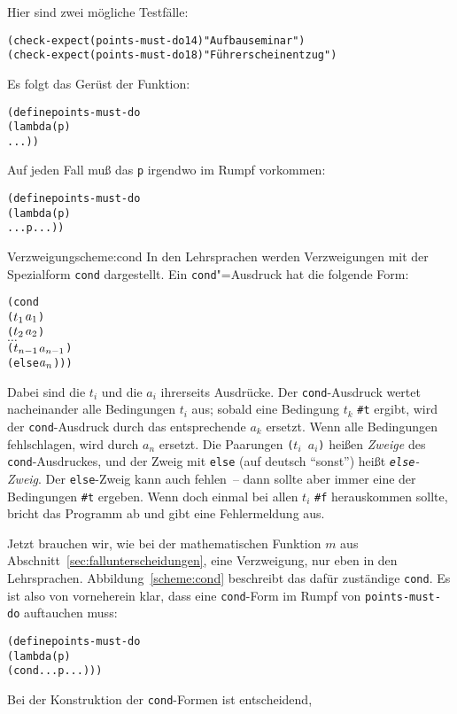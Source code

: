Hier sind zwei mögliche Testfälle:
%
\begin{alltt}
(check-expect (points-must-do 14) "Aufbauseminar")
(check-expect (points-must-do 18) "Führerscheinentzug")
\end{alltt}   
%
Es folgt das Gerüst der Funktion:
%
\begin{alltt}
(define points-must-do
  (lambda (p)
    ...))
\end{alltt}
%
Auf jeden Fall muß das \texttt{p} irgendwo im Rumpf vorkommen:
%
\begin{alltt}
(define points-must-do
  (lambda (p)
    ... p ...))
\end{alltt}
%
\begin{feature}{Verzweigung}{scheme:cond}
In den Lehrsprachen werden Verzweigungen
mit der Spezialform \texttt{cond} dargestellt.
Ein \texttt{cond}"=Ausdruck hat die folgende Form:
%
\begin{alltt}
(cond
  (\(t\sb{1}\) \(a\sb{1}\))
  (\(t\sb{2}\) \(a\sb{2}\))
  \(\ldots\)
  (\(t\sb{n-1}\) \(a\sb{n-1}\))
  (else \(a\sb{n}\))))
\end{alltt}
%
Dabei sind die $t_i$ und die $a_i$ ihrerseits Ausdrücke.  Der
\texttt{cond}-Ausdruck wertet nacheinander alle Bedingungen $t_i$ aus;
sobald eine Bedingung $t_k$ \texttt{\#t} ergibt, wird der
\texttt{cond}-Ausdruck durch das entsprechende $a_k$ ersetzt.  Wenn
alle Bedingungen fehlschlagen, wird durch $a_n$ ersetzt.  Die Paarungen
\texttt{($t_i$ $a_i$)} heißen \textit{Zweige} des
\texttt{cond}-Ausdruckes, und der Zweig mit \texttt{else} (auf deutsch
"`sonst"') heißt
\textit{\texttt{else}-Zweig}.
Der \texttt{else}-Zweig kann auch fehlen~-- dann sollte aber immer
eine der Bedingungen  \texttt{\#t} ergeben.  Wenn doch einmal bei allen
$t_i$ \verb|#f| herauskommen sollte, bricht \drscheme{} das Programm ab
und gibt eine Fehlermeldung aus.
\end{feature}
%
Jetzt brauchen wir, wie bei der mathematischen Funktion $m$ aus
Abschnitt~\ref{sec:fallunterscheidungen}, eine Verzweigung, nur eben
in den Lehrsprachen.  Abbildung~\ref{scheme:cond} beschreibt das dafür
zuständige \texttt{cond}.   Es ist also von vorneherein klar, dass eine
\texttt{cond}-Form im Rumpf von \texttt{points-must-do} auftauchen muss:
%
\begin{alltt}
(define points-must-do
  (lambda (p)
    (cond ... p ...)))
\end{alltt}
%
Bei der Konstruktion der \texttt{cond}-Formen ist entscheidend,
